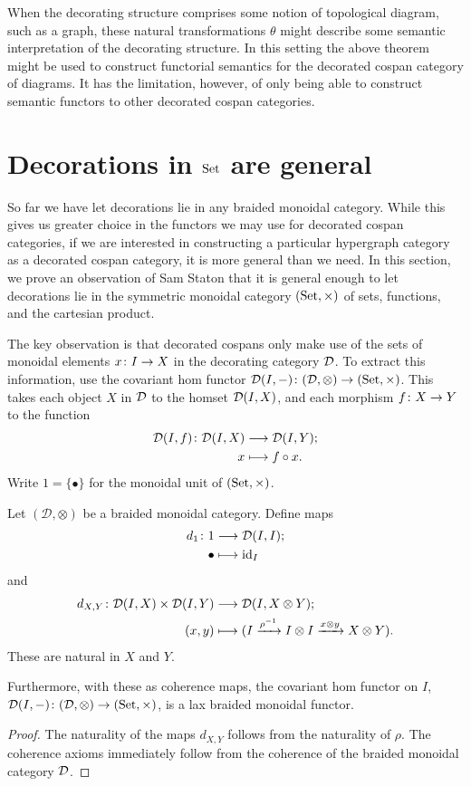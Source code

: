 When the decorating structure comprises some notion of topological diagram, such
as a graph, these natural transformations $\theta$ might describe some semantic
interpretation of the decorating structure. In this setting the above theorem
might be used to construct functorial semantics for the decorated cospan
category of diagrams. It has the limitation, however, of only being able to
construct semantic functors to other decorated cospan categories. 

\section{Decorations in $\mathrm{Set}$ are general} \label{sec.setdecs}

So far we have let decorations lie in any braided monoidal category. While this
gives us greater choice in the functors we may use for decorated cospan
categories, if we are interested in constructing a particular hypergraph
category as a decorated cospan category, it is more general than we need. In
this section, we prove an observation of Sam Staton that it is general enough to
let decorations lie in the symmetric monoidal category $(\mathrm{Set},\times)$ of sets,
functions, and the cartesian product. 

The key observation is that decorated cospans only make use of the sets of
monoidal elements $x{\colon} I \to X$ in the decorating category $\mathcal D$. To
extract this information, use the covariant hom functor $\mathcal D(I,-){\colon} (\mathcal
D,\otimes) \to (\mathrm{Set},\times)$. This takes each object $X$ in $\mathcal D$ to the homset
$\mathcal D(I,X)$, and each morphism $f{\colon} X \to Y$ to the function 
\begin{align*}
  \mathcal D(I,f){\colon} \mathcal D(I,X) &\longrightarrow \mathcal D(I,Y); \\ 
  x &\longmapsto f \circ x.
\end{align*}
Write $1=\{\bullet\}$ for the monoidal unit of $(\mathrm{Set},\times)$.

\begin{proposition} \label{prop.monglobalsecs}
  Let $(\mathcal D, \otimes)$ be a braided monoidal category. Define maps  
  \begin{align*}
    d_1{\colon} 1 &\longrightarrow \mathcal D(I,I); \\
    \bullet &\longmapsto \mathrm{id}_I
  \end{align*}
  and
  \begin{align*}
    d_{X,Y} {\colon} \mathcal D(I,X) \times \mathcal D(I,Y) &\longrightarrow \mathcal D(I, X \otimes
    Y);\\
    (x,y) &\longmapsto (I \xrightarrow{\rho^{-1}} I \otimes I \xrightarrow{x \otimes y} X \otimes
    Y).
  \end{align*}
  These are natural in $X$ and $Y$. 

  Furthermore, with these as coherence maps, the covariant hom functor on $I$,
  $\mathcal D(I,-){\colon} (\mathcal D,\otimes) \to (\mathrm{Set},\times)$, is a lax braided monoidal
  functor. 
\end{proposition}
\begin{proof}
  The naturality of the maps $d_{X,Y}$ follows from the naturality of $\rho$.
  The coherence axioms immediately follow from the coherence of the braided
  monoidal category $\mathcal D$.
\end{proof}

